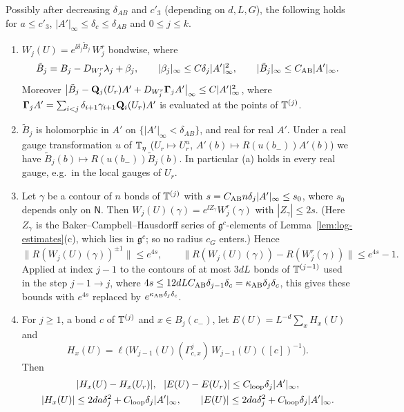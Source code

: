 \begin{lemma}\label{lem:AB-bounds}
Possibly after decreasing $\delta_{AB}$ and $c'_3$ (depending on $d,L,G$), the following holds for $a\le c'_3$, $|A'|_\infty\le\delta_c\le\delta_{AB}$ and $0\le j\le k$.
\begin{enumerate}[label=(\alph*)]
\item $W_j(U)=e^{\ii\delta_j\tilde B_j}\,W^r_j$ bondwise, where
\begin{equation}\label{eq:AB-field}
\tilde B_j=B_j-D_{W^r_j}\lambda_j+\beta_j,\qquad|\beta_j|_\infty\le C\delta_j|A'|^2_\infty,\qquad|\tilde B_j|_\infty\le C_{\rm AB}|A'|_\infty .
\end{equation}
Moreover $\big|\tilde B_j-\mathbf Q_j(U_r)A'+D_{W^r_j}\boldsymbol\Gamma_jA'\big|_\infty\le C|A'|_\infty^2$, where $\boldsymbol\Gamma_jA'=\sum_{i<j}\delta_{i+1}\gamma_{i+1}\mathbf Q_i(U_r)A'$ is evaluated at the points of $\mathbb T^{(j)}$.
\item $\tilde B_j$ is holomorphic in $A'$ on $\{|A'|_\infty<\delta_{AB}\}$, and real for real $A'$. Under a real gauge transformation $u$ of $\mathbb T_\eta$ ($U_r\mapsto U_r^u$, $A'(b)\mapsto R(u(b_-))A'(b)$) we have $\tilde B_j(b)\mapsto R(u(b_-))\tilde B_j(b)$. In particular (a) holds in every real gauge, e.g.\ in the local gauges of $U_r$.
\item Let $\gamma$ be a contour of $n$ bonds of $\mathbb T^{(j)}$ with $s=C_{\rm AB}n\delta_j|A'|_\infty\le s_0$, where $s_0$ depends only on $\mathsf N$. Then $W_j(U)(\gamma)=e^{\ii Z_\gamma}W^r_j(\gamma)$ with $|Z_\gamma|\le2s$. (Here $Z_\gamma$ is the Baker--Campbell--Hausdorff series of $\mathfrak g^c$-elements of Lemma~\ref{lem:log-estimates}(c), which lies in $\mathfrak g^c$; so no radius $c_G$ enters.) Hence
\[
\|R(W_j(U)(\gamma))^{\pm1}\|\le e^{4s},\qquad\|R(W_j(U)(\gamma))-R(W^r_j(\gamma))\|\le e^{4s}-1 .
\]
Applied at index $j-1$ to the contours of at most $3dL$ bonds of $\mathbb T^{(j-1)}$ used in the step $j-1\to j$, where $4s\le12dLC_{\rm AB}\delta_{j-1}\delta_c=\kappa_{\rm AB}\delta_j\delta_c$, this gives these bounds with $e^{4s}$ replaced by $e^{\kappa_{\rm AB}\delta_j\delta_c}$.
\item For $j\ge1$, a bond $c$ of $\mathbb T^{(j)}$ and $x\in B_j(c_-)$, let $E(U)=L^{-d}\sum_xH_x(U)$ and
\[
H_x(U)=\ell\big(W_{j-1}(U)(\Gamma^j_{c,x})\,W_{j-1}(U)([c])^{-1}\big).
\]
Then
\begin{gather*}
|H_x(U)-H_x(U_r)|,\ \ |E(U)-E(U_r)|\le C_{\rm loop}\delta_j|A'|_\infty,\\
|H_x(U)|\le2da\delta_j^2+C_{\rm loop}\delta_j|A'|_\infty,\qquad|E(U)|\le2da\delta_j^2+C_{\rm loop}\delta_j|A'|_\infty .
\end{gather*}
\end{enumerate}
\end{lemma}

